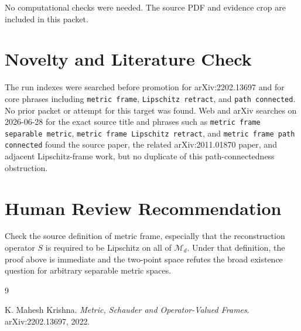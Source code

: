 \documentclass[11pt]{article}
\begin{document}
No computational checks were needed.  The source PDF and evidence crop are
included in this packet.

\section*{Novelty and Literature Check}

The run indexes were searched before promotion for arXiv:2202.13697 and for
core phrases including \texttt{metric frame}, \texttt{Lipschitz retract}, and
\texttt{path connected}.  No prior packet or attempt for this target was
found.  Web and arXiv searches on 2026-06-28 for the exact source title and
phrases such as \texttt{metric frame separable metric}, \texttt{metric frame
Lipschitz retract}, and \texttt{metric frame path connected} found the source
paper, the related arXiv:2011.01870 paper, and adjacent Lipschitz-frame work,
but no duplicate of this path-connectedness obstruction.

\section*{Human Review Recommendation}

Check the source definition of metric frame, especially that the reconstruction
operator \(S\) is required to be Lipschitz on all of \(\mathcal M_d\).  Under
that definition, the proof above is immediate and the two-point space refutes
the broad existence question for arbitrary separable metric spaces.

\begin{thebibliography}{9}

K. Mahesh Krishna.
\newblock \emph{Metric, Schauder and Operator-Valued Frames}.
\newblock arXiv:2202.13697, 2022.

\end{thebibliography}
\end{document}
